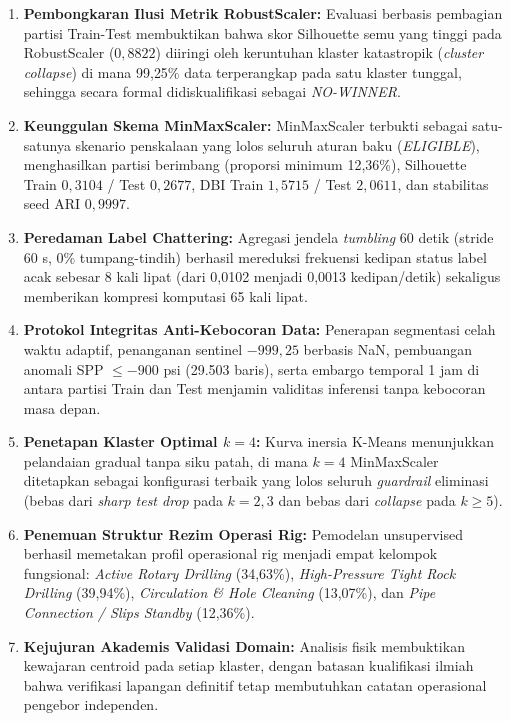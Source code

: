 \documentclass[conference]{IEEEtran}
\begin{document}
\begin{enumerate}
\item \textbf{Pembongkaran Ilusi Metrik RobustScaler:} Evaluasi berbasis pembagian partisi Train-Test membuktikan bahwa skor Silhouette semu yang tinggi pada RobustScaler ($0{,}8822$) diiringi oleh keruntuhan klaster katastropik (\textit{cluster collapse}) di mana 99{,}25\% data terperangkap pada satu klaster tunggal, sehingga secara formal didiskualifikasi sebagai \textit{NO-WINNER}.
\item \textbf{Keunggulan Skema MinMaxScaler:} MinMaxScaler terbukti sebagai satu-satunya skenario penskalaan yang lolos seluruh aturan baku (\textit{ELIGIBLE}), menghasilkan partisi berimbang (proporsi minimum 12,36\%), Silhouette Train $0{,}3104$ / Test $0{,}2677$, DBI Train $1{,}5715$ / Test $2{,}0611$, dan stabilitas seed ARI $0{,}9997$.
\item \textbf{Peredaman Label Chattering:} Agregasi jendela \textit{tumbling} 60 detik (stride 60 s, 0\% tumpang-tindih) berhasil mereduksi frekuensi kedipan status label acak sebesar 8 kali lipat (dari 0,0102 menjadi 0,0013 kedipan/detik) sekaligus memberikan kompresi komputasi 65 kali lipat.
\item \textbf{Protokol Integritas Anti-Kebocoran Data:} Penerapan segmentasi celah waktu adaptif, penanganan sentinel $-999{,}25$ berbasis NaN, pembuangan anomali SPP $\le -900$ psi (29.503 baris), serta embargo temporal 1 jam di antara partisi Train dan Test menjamin validitas inferensi tanpa kebocoran masa depan.
\item \textbf{Penetapan Klaster Optimal $k=4$:} Kurva inersia K-Means menunjukkan pelandaian gradual tanpa siku patah, di mana $k=4$ MinMaxScaler ditetapkan sebagai konfigurasi terbaik yang lolos seluruh \textit{guardrail} eliminasi (bebas dari \textit{sharp test drop} pada $k=2,3$ dan bebas dari \textit{collapse} pada $k \ge 5$).
\item \textbf{Penemuan Struktur Rezim Operasi Rig:} Pemodelan unsupervised berhasil memetakan profil operasional rig menjadi empat kelompok fungsional: \textit{Active Rotary Drilling} (34,63\%), \textit{High-Pressure Tight Rock Drilling} (39,94\%), \textit{Circulation \& Hole Cleaning} (13,07\%), dan \textit{Pipe Connection / Slips Standby} (12,36\%).
\item \textbf{Kejujuran Akademis Validasi Domain:} Analisis fisik membuktikan kewajaran centroid pada setiap klaster, dengan batasan kualifikasi ilmiah bahwa verifikasi lapangan definitif tetap membutuhkan catatan operasional pengebor independen.
\end{enumerate}
\end{document}
